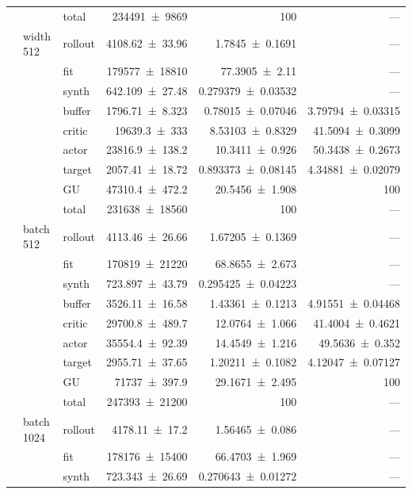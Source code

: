 {\begin{longtable}{@{}lllrrr@{}}
     &  & total & \num{234491+-9869} & \num{100} & --- \\
    \addlinespace[2pt]
     & width 512 & rollout & \num{4108.62+-33.96} & \num{1.7845+-0.1691} & --- \\
     &  & fit & \num{179577+-18810} & \num{77.3905+-2.11} & --- \\
     &  & synth & \num{642.109+-27.48} & \num{0.279379+-0.03532} & --- \\
     &  & buffer & \num{1796.71+-8.323} & \num{0.78015+-0.07046} & \num{3.79794+-0.03315} \\
     &  & critic & \num{19639.3+-333} & \num{8.53103+-0.8329} & \num{41.5094+-0.3099} \\
     &  & actor & \num{23816.9+-138.2} & \num{10.3411+-0.926} & \num{50.3438+-0.2673} \\
     &  & target & \num{2057.41+-18.72} & \num{0.893373+-0.08145} & \num{4.34881+-0.02079} \\
     &  & GU & \num{47310.4+-472.2} & \num{20.5456+-1.908} & 100 \\
     &  & total & \num{231638+-18560} & \num{100} & --- \\
    \addlinespace[2pt]
     & batch 512 & rollout & \num{4113.46+-26.66} & \num{1.67205+-0.1369} & --- \\
     &  & fit & \num{170819+-21220} & \num{68.8655+-2.673} & --- \\
     &  & synth & \num{723.897+-43.79} & \num{0.295425+-0.04223} & --- \\
     &  & buffer & \num{3526.11+-16.58} & \num{1.43361+-0.1213} & \num{4.91551+-0.04468} \\
     &  & critic & \num{29700.8+-489.7} & \num{12.0764+-1.066} & \num{41.4004+-0.4621} \\
     &  & actor & \num{35554.4+-92.39} & \num{14.4549+-1.216} & \num{49.5636+-0.352} \\
     &  & target & \num{2955.71+-37.65} & \num{1.20211+-0.1082} & \num{4.12047+-0.07127} \\
     &  & GU & \num{71737+-397.9} & \num{29.1671+-2.495} & 100 \\
     &  & total & \num{247393+-21200} & \num{100} & --- \\
    \addlinespace[2pt]
     & batch 1024 & rollout & \num{4178.11+-17.2} & \num{1.56465+-0.086} & --- \\
     &  & fit & \num{178176+-15400} & \num{66.4703+-1.969} & --- \\
     &  & synth & \num{723.343+-26.69} & \num{0.270643+-0.01272} & --- \\

\end{longtable}}
